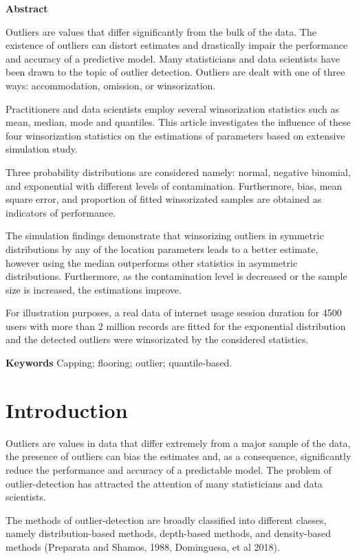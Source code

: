 \documentclass[
]{article}
\author{
Ali Abuzaid\\Department of Mathematics, Al Azhar University -
Gaza \And Eyad Alkronz\\Department of Information Technology , Al azhar
University - Gaza
}
\title{}
\begin{document}
\textbf{Abstract}

Outliers are values that differ significantly from the bulk of the data.
The existence of outliers can distort estimates and drastically impair
the performance and accuracy of a predictive model. Many statisticians
and data scientists have been drawn to the topic of outlier detection.
Outliers are dealt with one of three ways: accommodation, omission, or
winsorization.

Practitioners and data scientists employ several winsorization
statistics such as mean, median, mode and quantiles. This article
investigates the influence of these four winsorization statistics on the
estimations of parameters based on extensive simulation study.

Three probability distributions are considered namely: normal, negative
binomial, and exponential with different levels of contamination.
Furthermore, bias, mean square error, and proportion of fitted
winsorizated samples are obtained as indicators of performance.

The simulation findings demonstrate that winsorizing outliers in
symmetric distributions by any of the location parameters leads to a
better estimate, however using the median outperforms other statistics
in asymmetric distributions. Furthermore, as the contamination level is
decreased or the sample size is increased, the estimations improve.

For illustration purposes, a real data of internet usage session
duration for 4500 users with more than 2 million records are fitted for
the exponential distribution and the detected outliers were winsorizated
by the considered statistics.

\textbf{Keywords} Capping; flooring; outlier; quantile-based.

\hypertarget{introduction}{%
\section{Introduction}\label{introduction}}

Outliers are values in data that differ extremely from a major sample of
the data, the presence of outliers can bias the estimates and, as a
consequence, significantly reduce the performance and accuracy of a
predictable model. The problem of outlier-detection has attracted the
attention of many statisticians and data scientists.

The methods of outlier-detection are broadly classified into different
classes, namely distribution-based methods, depth-based methods, and
density-based methods (Preparata and Shamos, 1988, Dominguesa, et al
2018).
\end{document}
